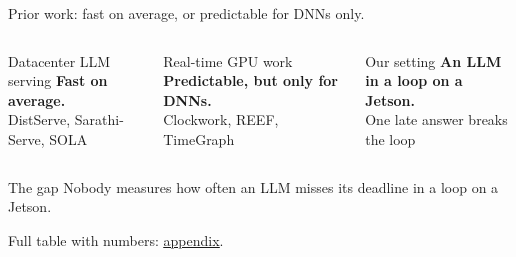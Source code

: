 \documentclass[11pt,aspectratio=43]{beamer}
\begin{document}
\begin{frame}{Prior work: fast on average, or predictable for DNNs only.}

\vspace{0.4cm}
\begin{columns}[T,onlytextwidth]
\begin{block}{Datacenter LLM serving}
  \small
  \textbf{Fast on average.}\\[0.3em]
  {\scriptsize\color{gray2} DistServe, Sarathi-Serve, SOLA}
\end{block}
\begin{block}{Real-time GPU work}
  \small
  \textbf{Predictable, but only for DNNs.}\\[0.3em]
  {\scriptsize\color{gray2} Clockwork, REEF, TimeGraph}
\end{block}
\begin{block}{Our setting}
  \small
  \textbf{An LLM in a loop on a Jetson.}\\[0.3em]
  {\scriptsize\color{gray2} One late answer breaks the loop}
\end{block}
\end{columns}

\vspace{0.9cm}
\begin{center}
\begin{minipage}{0.85\textwidth}
\begin{block}{The gap}
  \small
  Nobody measures how often an LLM misses its deadline in a loop on a Jetson.
\end{block}
\end{minipage}
\end{center}

\vfill
{\scriptsize\color{gray2} Full table with numbers: \hyperlink{priortable}{\underline{appendix}}.}

\end{frame}
\end{document}
